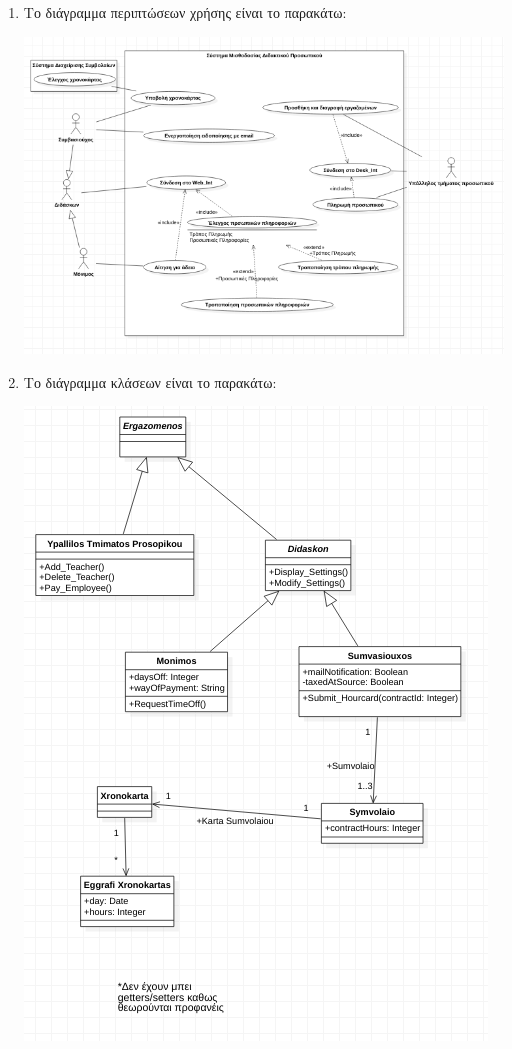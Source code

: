\documentclass[12pt]{article}
\begin{document}
\begin{enumerate}
\newpage
\item
Το διάγραμμα περιπτώσεων χρήσης είναι το παρακάτω:
\begin{center}
\includegraphics[scale=0.6]{use_case}
\end{center}

\newpage
\item
Το διάγραμμα κλάσεων είναι το παρακάτω:
\begin{center}
\includegraphics[scale=0.8]{class_diag}
\end{center}


\end{enumerate}
\end{document}
